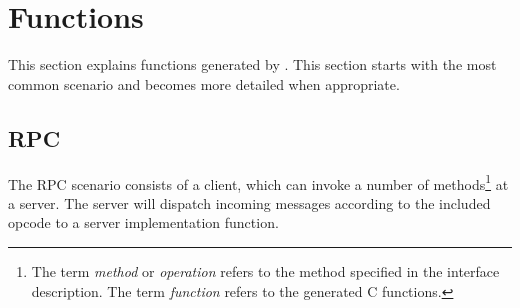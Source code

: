 \section{Functions}
\label{sec:functions}

This section explains functions generated by \dice{}.
This section starts with the most common scenario and becomes more detailed
when appropriate.

\subsection{RPC}
The RPC scenario consists of a client, which can invoke a number of 
methods\footnote{The term \emph{method} or \emph{operation} refers to the 
method specified in the interface description. The term \emph{function}
refers to the generated C functions.} at a server.  The server will 
dispatch incoming messages according to the included opcode to a server
implementation function.

